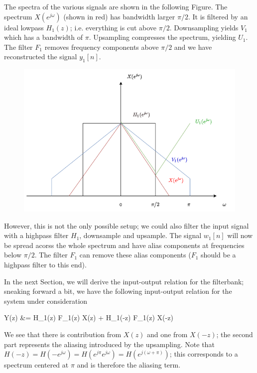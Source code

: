 The spectra of the various signals are shown in the following Figure. The spectrum $X(e^{j\omega})$ (shown in red) has bandwidth larger $\pi/2$. It is filtered by an ideal lowpass $H_1(z)$; i.e. everything is cut above $\pi/2$. Downsampling yields $V_1$ which has a bandwidth of $\pi$. Upsampling compresses the spectrum, yielding $U_1$. The filter $F_1$ removes frequency components above $\pi/2$ and we have reconstructed the signal $y_1[n]$.

\begin{figure}[H]
    \centering
    \includegraphics[scale=0.5]{images/2021-11-09-subband_08.png}
\end{figure}

However, this is not the only possible setup; we could also filter the input signal with a highpass filter $H_1$, downsample and upsample. The signal $w_1[n]$ will now be spread acorss the whole spectrum and have alias components at frequencies below $\pi/2$. The filter $F_1$ can remove these alias components ($F_1$ should be a highpass filter to this end).

In the next Section, we will derive the input-output relation for the filterbank; sneaking forward a bit, we have the following input-output relation for the system under consideration

\bee
Y(z) &=  H_1(z) F_1(z) X(z) +  H_1(-z) F_1(z) X(-z)
\eee

We see that there is contribution from $X(z)$ and one from $X(-z)$; the second part represents the aliasing introduced by the upsampling. Note that $H(-z) = H(-e^{j \omega}) = H(e^{j \pi} e^{j \omega}) = H(e^{j(\omega + \pi)})$; this corresponds to a spectrum centered at $\pi$ and is therefore the aliasing term.

